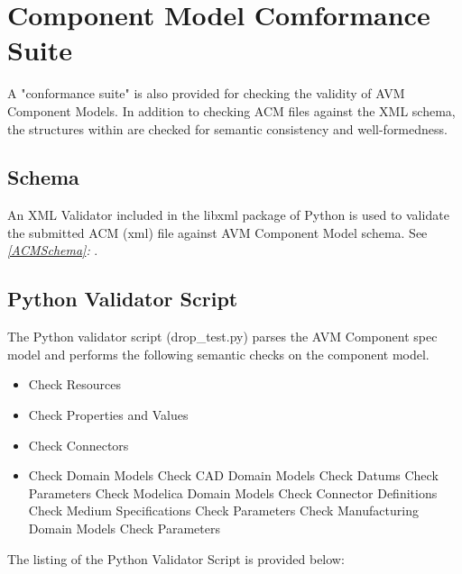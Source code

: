 
\chapter{Component Model Comformance Suite}
A "conformance suite" is also provided for checking the validity of AVM Component Models. In addition to checking ACM files against the XML schema, the structures within are checked for semantic consistency and well-formedness.

\section{Schema}
An XML Validator included in the libxml package of Python is used to validate the submitted ACM (xml) file against AVM Component Model schema.  
See \textit{\autoref{ACMSchema}: }.

\section{Python Validator Script}
The Python validator script (drop\_test.py) parses the AVM Component spec model and performs the following semantic checks on the component model.

\begin{itemize}
\item Check Resources
\item Check Properties and Values
\item Check Connectors
\item Check Domain Models
\subitem Check CAD Domain Models
\subsubitem Check Datums
\subsubitem Check Parameters
\subitem Check Modelica Domain Models
\subsubitem Check Connector Definitions
\subsubitem Check Medium Specifications
\subsubitem Check Parameters
\subitem Check Manufacturing Domain Models
\subsubitem Check Parameters
\end{itemize}

The listing of the Python Validator Script is provided below:

